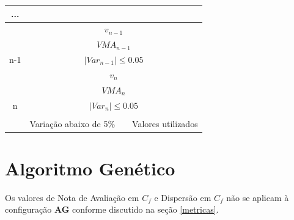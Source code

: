 \begin{table}[htb]
{\begin{tabular}{ccllllll}
\multicolumn{1}{c|}{...} & \multicolumn{1}{r|}{} & \multicolumn{1}{r|}{} & \multicolumn{1}{r|}{} & \multicolumn{1}{r|}{} & \multicolumn{1}{r|}{} & \multicolumn{1}{r|}{} & \multicolumn{1}{r}{} \\ \hline
\multicolumn{1}{c|}{} & \multicolumn{7}{c|}{$v_{n-1}$} \\ \cline{2-8} 
\multicolumn{1}{c|}{} & \multicolumn{7}{c|}{${VMA}_{n-1}$} \\ \cline{2-8} 
\multicolumn{1}{c|}{\multirow{-3}{*}{n-1}} & \multicolumn{7}{c|}{\cellcolor[HTML]{ADDDAD}$|{Var}_{n-1}| \leq 0.05$} \\ \hline
\multicolumn{1}{c|}{} & \multicolumn{7}{c|}{$v_n$} \\ \cline{2-8} 
\multicolumn{1}{c|}{} & \multicolumn{7}{c|}{\cellcolor[HTML]{FFCE93}${VMA}_n$} \\ \cline{2-8} 
\multicolumn{1}{c|}{\multirow{-3}{*}{n}} & \multicolumn{7}{c|}{\cellcolor[HTML]{ADDDAD}$|{Var}_n| \leq 0.05$} \\ \hline 
\multicolumn{1}{l}{} & \multicolumn{1}{l}{} &  &  &  &  &  &  \\ \cline{2-4} \cline{6-8} 
\multicolumn{1}{l|}{\cellcolor[HTML]{FFFFFF}} & \multicolumn{3}{c|}{\cellcolor[HTML]{ADDDAD}Variação abaixo de 5\%} & \multicolumn{1}{l|}{\cellcolor[HTML]{FFFFFF}} & \multicolumn{3}{c|}{\cellcolor[HTML]{FFCE93}Valores utilizados} \\ \cline{2-4} \cline{6-8} 
\end{tabular}%
}
\end{table}

\pagebreak

\section{Algoritmo Genético}

Os valores de Nota de Avaliação em $C_f$ e Dispersão em $C_f$ não se aplicam à configuração \textbf{AG} conforme discutido na seção \ref{metricas}.

